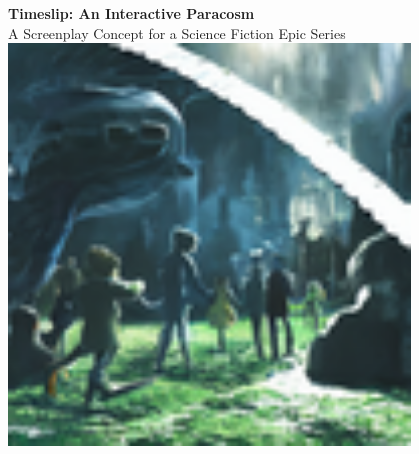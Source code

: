 \documentclass[10pt,letterpaper]{article}
\begin{document}
\begin{center}
{\Huge \textbf{Timeslip: An Interactive Paracosm}} \\
\vspace{0.2cm}
{\large A Screenplay Concept for a Science Fiction Epic Series} \\
\vspace{0.3cm}
\includegraphics[width=0.8\textwidth]{title_image.jpg} %
\end{center}
\end{document}
